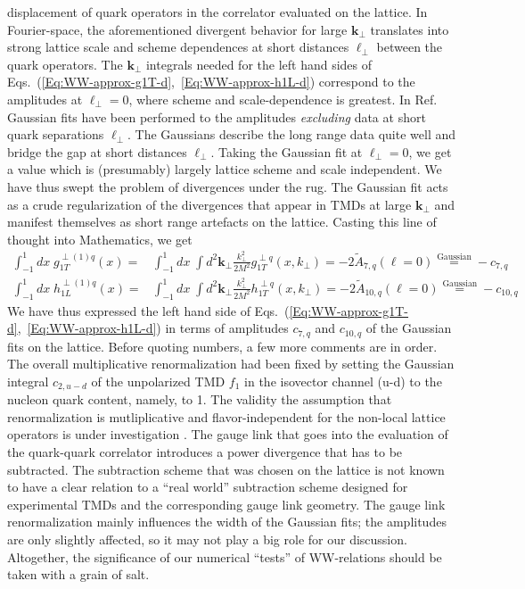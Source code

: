 \documentclass[a4paper,11pt]{article}
\newcommand{\ba}{\begin{eqnarray}}
\newcommand{\ea}{\end{eqnarray}}
\def\bflperp{{\bm \ell}_\perp}
\def\bfkperp{{\bm k}_\perp}
\def\kperp{k_\perp}
\begin{document}
displacement of quark operators in the correlator evaluated on the lattice. 
In Fourier-space, the aforementioned divergent behavior for large $\bfkperp$ 
translates into strong lattice scale and scheme dependences at short distances
$\bflperp$ between the quark operators. The $\bfkperp$ integrals needed for 
the left hand sides of Eqs.~(\ref{Eq:WW-approx-g1T-d},~\ref{Eq:WW-approx-h1L-d})
correspond to the amplitudes at $\bflperp = 0$, where scheme and 
scale-dependence is greatest.  In Ref.~\cite{Musch:2010ka} Gaussian fits 
have been performed to the amplitudes \emph{excluding} data at short quark 
separations $\bflperp$. The Gaussians describe the long range data quite well 
and bridge the gap at short distances $\bflperp$. 
Taking the Gaussian fit at $\bflperp = 0$, we get a value which is 
(presumably) largely lattice scheme and scale independent. We have thus 
swept the problem of divergences under the rug. The Gaussian fit acts as 
a crude regularization of the divergences that appear in TMDs at large 
$\bfkperp$ and manifest themselves as short range artefacts on the lattice. 
Casting this line of thought into Mathematics, we get
\ba
    	\int_{-1}^1 d x\; g_{1T}^{\perp(1)q}(x) 
	= & \int_{-1}^1 d x\; \int  d^2 \bfkperp 
	\frac{\kperp^2}{2M^2} g_{1T}^{\perp q}(x,\kperp) 
	= -2 \tilde{A}_{7,q}( \ell = 0 ) 
	\stackrel{\text{Gaussian}}{=} -c_{7,q}\\
    	\int_{-1}^1 d x\; h_{1L}^{\perp(1)q}(x) 
	= & \int_{-1}^1 d x\; \int  d^2 \bfkperp 
	\frac{\kperp^2}{2M^2} h_{1T}^{\perp q}(x,\kperp) 
	= -2 \tilde{A}_{10,q}( \ell = 0 ) 
	\stackrel{\text{Gaussian}}{=} -c_{10,q}
\ea
We have thus expressed the left hand side of 
Eqs.~(\ref{Eq:WW-approx-g1T-d},~\ref{Eq:WW-approx-h1L-d}) in terms of 
amplitudes $c_{7,q}$ and $c_{10,q}$ of the Gaussian fits on the lattice.
Before quoting numbers, a few more comments are in order. The overall 
multiplicative renormalization had been fixed by setting the Gaussian 
integral $c_{2,u-d}$ of the unpolarized TMD $f_1$ in the isovector channel 
(u-d) to the nucleon quark content, namely, to 1. The validity the 
assumption that renormalization is mutliplicative and flavor-independent 
for the non-local lattice operators is under investigation 
\cite{Yoon:2017qzo}. %
The gauge link that goes into the evaluation of the quark-quark correlator 
introduces a power divergence that has to be subtracted. The subtraction 
scheme that was chosen on the lattice is not known to have a clear relation 
to a ``real world'' subtraction scheme designed for experimental TMDs and 
the corresponding gauge link geometry. The gauge link renormalization mainly 
influences the width of the Gaussian fits; the amplitudes are only slightly 
affected, so it may not play a big role for our discussion. Altogether, the 
significance of our numerical ``tests'' of WW-relations should be taken 
with a grain of salt.
\end{document}
